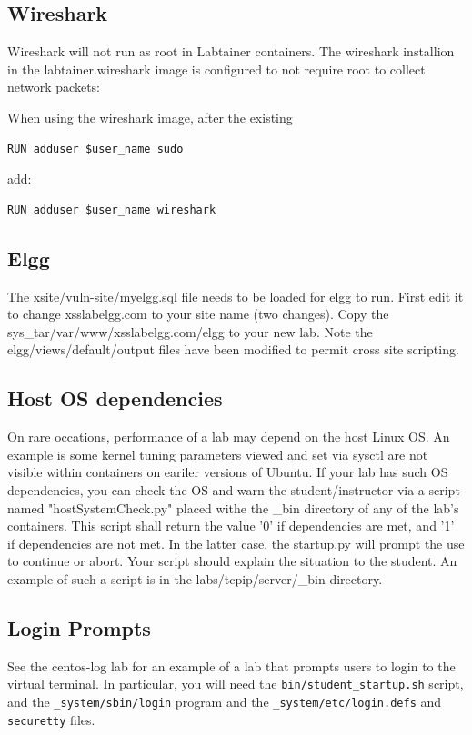 \documentclass[12pt]{article}
\begin{document}
\subsection{Wireshark}
Wireshark will not run as root in Labtainer containers.  
The wireshark installion in the labtainer.wireshark image is configured to not
require root to collect network packets:

When using the wireshark image, after the existing 
\begin{verbatim}
RUN adduser $user_name sudo
\end{verbatim}

\noindent add:

\begin{verbatim}
RUN adduser $user_name wireshark
\end{verbatim}

\subsection{Elgg}
The xsite/vuln-site/myelgg.sql file needs to be loaded for elgg to run.  First edit it to
change xsslabelgg.com to your site name (two changes).  Copy the sys\_tar/var/www/xsslabelgg.com/elgg
to your new lab.  Note the elgg/views/default/output files have been modified to permit cross site scripting.
\subsection{Host OS dependencies}
On rare occations, performance of a lab may depend on the host Linux OS.  An example is some
kernel tuning parameters viewed and set via sysctl are not visible within containers on eariler versions
of Ubuntu.  If your lab has such OS dependencies, you can check the OS and warn the student/instructor via a script
named "hostSystemCheck.py" placed withe the \_bin directory of any of the lab's containers.  This script shall
return the value '0' if dependencies are met, and '1' if dependencies are not met.  In the latter case, the 
startup.py will prompt the use to continue or abort.  Your script should explain the situation to the student.
An example of such a script is in the labs/tcpip/server/\_bin directory.
\subsection{Login Prompts}
See the centos-log lab for an example of a lab that prompts users to login to the virtual terminal.
In particular, you will need the {\tt bin/student\_startup.sh} script, and the {\tt \_system/sbin/login} program and the {\tt \_system/etc/login.defs} and {\tt securetty} files.
\end{document}
